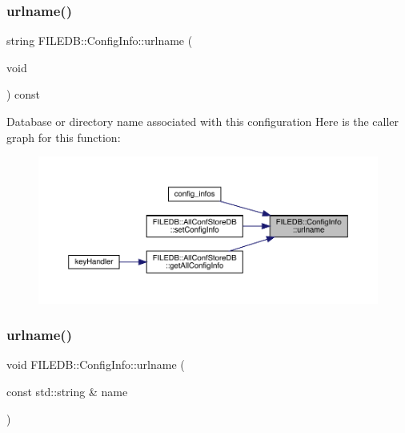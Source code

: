 \subsubsection{\texorpdfstring{urlname()}{urlname()}\hspace{0.1cm}{\footnotesize\ttfamily [2/4]}}
{\footnotesize\ttfamily string F\+I\+L\+E\+D\+B\+::\+Config\+Info\+::urlname (\begin{DoxyParamCaption}\item[{void}]{ }\end{DoxyParamCaption}) const}

Database or directory name associated with this configuration Here is the caller graph for this function\+:\nopagebreak
\begin{figure}[H]
\begin{center}
\leavevmode
\includegraphics[width=350pt]{d0/d90/classFILEDB_1_1ConfigInfo_a2ed44f5e85fa1b69bb30fcad8cf71fa3_icgraph}
\end{center}
\end{figure}
\mbox{\label{classFILEDB_1_1ConfigInfo_a49750ae80347780d48415cb7aac9a068}} 
\subsubsection{\texorpdfstring{urlname()}{urlname()}\hspace{0.1cm}{\footnotesize\ttfamily [3/4]}}
{\footnotesize\ttfamily void F\+I\+L\+E\+D\+B\+::\+Config\+Info\+::urlname (\begin{DoxyParamCaption}\item[{const std\+::string \&}]{name }\end{DoxyParamCaption})}

\mbox{\label{classFILEDB_1_1ConfigInfo_a49750ae80347780d48415cb7aac9a068}} 
